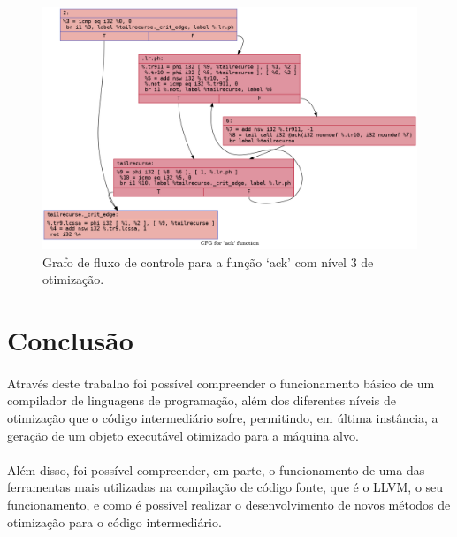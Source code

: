 \documentclass[12pt]{article}
\begin{document}
\begin{figure}
    \centering
    \includegraphics[width=0.5\linewidth]{recursive_.ack_O3.png}
    \caption{Grafo de fluxo de controle para a função ‘ack’ com nível 3 de otimização.}
\end{figure}

\FloatBarrier

\section{Conclusão}

\paragraph{}Através deste trabalho foi possível compreender o funcionamento básico de um compilador de linguagens de programação, além dos diferentes níveis de otimização que o código intermediário sofre, permitindo, em última instância, a geração de um objeto executável otimizado para a máquina alvo.

\paragraph{}Além disso, foi possível compreender, em parte, o funcionamento de uma das ferramentas mais utilizadas na compilação de código fonte, que é o LLVM, o seu funcionamento, e como é possível realizar o desenvolvimento de novos métodos de otimização para o código intermediário.
\end{document}
